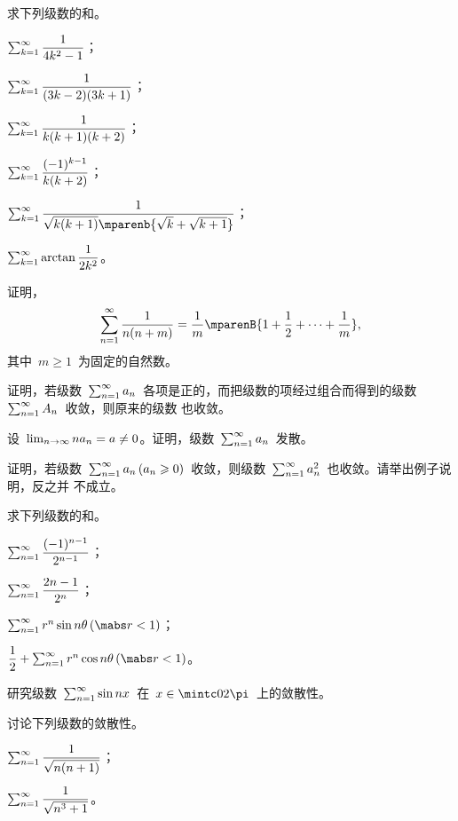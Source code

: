 \begin{exercise}
\item 求下列级数的和。
\begin{exlistcols}
  \item $\sum_{k=1}^\infty\dfrac1{4k^2-1}$；
  \item $\sum_{k=1}^\infty\dfrac1{(3k-2)(3k+1)}$；
  \item $\sum_{k=1}^\infty\dfrac1{k(k+1)(k+2)}$；
  \item $\sum_{k=1}^\infty\dfrac{(-1)^{k-1}}{k(k+2)}$；
  \item $\sum_{k=1}^\sinf\dfrac1{\smbsqrt{k(k+1)}\mparenb{\sqrt k+\sqrt{k+1}}}$；
  \item $\sum_{k=1}^\infty\arctan\dfrac1{2k^2}$。
\end{exlistcols}
\item 证明，
\[
  \sum_{n=1}^\sinf\frac1{n(n+m)}=\frac1m\mparenB{1+\frac12+\dotsb+\frac1m},
\]
其中~$m\geq1$~为固定的自然数。
\item 证明，若级数~$\sum_{n=1}^\infty a_n$~各项是正的，而把级数的项经过组合而得到的级数~$\sum_{n=1}^\infty A_n$~收敛，则原来的级数
也收敛。
\item 设~$\lim_{n\to\infty} na_n=a\neq0$。证明，级数~$\sum_{n=1}^\infty a_n$~发散。
\item 证明，若级数~$\sum_{n=1}^\sinf a_n\mcond{a_n\geq0}$~收敛，则级数~$\sum_{n=1}^\infty a_n^2$~也收敛。请举出例子说明，反之并
不成立。
\item 求下列级数的和。
\begin{exlistcols}
  \item $\sum_{n=1}^\infty\dfrac{(-1)^{n-1}}{2^{n-1}}$；
  \item $\sum_{n=1}^\infty\dfrac{2n-1}{2^n}$；
  \item $\sum_{n=1}^\sinf r^n\sin n\theta\mcond{\mabs r<1}$；
  \item $\dfrac12+\sum_{n=1}^\sinf r^n\cos n\theta\mcond{\mabs r<1}$。
\end{exlistcols}
\item 研究级数~$\sum_{n=1}^\infty\sin nx$~在~$x\in\mintc 0{2\pi}$~上的敛散性。
\item 讨论下列级数的敛散性。
\begin{exlistcols}
  \item $\sum_{n=1}^\sinf\dfrac1{\smbsqrt{n(n+1)}}$；
  \item $\sum_{n=1}^\infty\dfrac1{\sqrt{n^3+1}}$。
\end{exlistcols}
\end{exercise}

